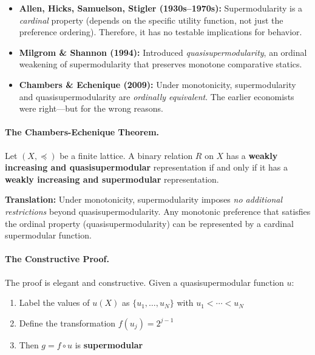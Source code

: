 \begin{itemize}
    \item \textbf{Allen, Hicks, Samuelson, Stigler (1930s--1970s):} 
    Supermodularity is a \emph{cardinal} property (depends on the specific 
    utility function, not just the preference ordering). Therefore, it has 
    no testable implications for behavior.
    
    \item \textbf{Milgrom \& Shannon (1994):} Introduced \emph{quasisupermodularity}, 
    an ordinal weakening of supermodularity that preserves monotone comparative 
    statics.
    
    \item \textbf{Chambers \& Echenique (2009):} Under monotonicity, 
    supermodularity and quasisupermodularity are \emph{ordinally equivalent}. 
    The earlier economists were right---but for the wrong reasons.
\end{itemize}

\paragraph{The Chambers-Echenique Theorem.}

\begin{theorem}
\label{thm:chambers-echenique}
Let $(X, \preceq)$ be a finite lattice. A binary relation $R$ on $X$ has a 
\textbf{weakly increasing and quasisupermodular} representation if and only 
if it has a \textbf{weakly increasing and supermodular} representation.
\end{theorem}

\textbf{Translation:} Under monotonicity, supermodularity imposes \emph{no 
additional restrictions} beyond quasisupermodularity. Any monotonic preference 
that satisfies the ordinal property (quasisupermodularity) can be represented 
by a cardinal supermodular function.

\paragraph{The Constructive Proof.}
The proof is elegant and constructive. Given a quasisupermodular function $u$:
\begin{enumerate}
    \item Label the values of $u(X)$ as $\{u_1, \ldots, u_N\}$ with $u_1 < \cdots < u_N$
    \item Define the transformation $f(u_j) = 2^{j-1}$
    \item Then $g = f \circ u$ is \textbf{supermodular}
\end{enumerate}

